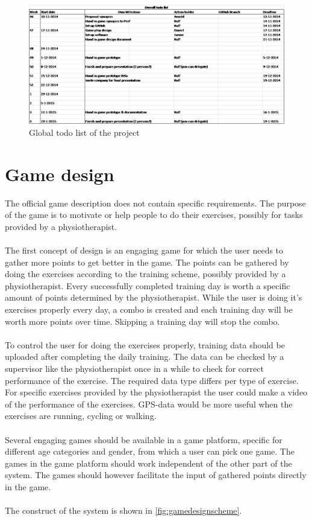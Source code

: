 \documentclass[a4paper,11pt,notitlepage]{report}
\begin{document}
\begin{figure}[H]
	\centering
		\includegraphics[width=1.00\textwidth]{Images/Todolist.png}
	\caption{Global todo list of the project}
	\label{fig:Todolist}
\end{figure}

\chapter{Game design}
The official game description does not contain specific requirements. The purpose of the game is to motivate or help people to do their exercises, possibly for tasks provided by a physiotherapist. \\
\\
The first concept of design is an engaging game for which the user needs to gather more points to get better in the game. The points can be gathered by doing the exercises according to the training scheme, possibly provided by a physiotherapist. Every successfully completed training day is worth a specific amount of points determined by the physiotherapist. While the user is doing it's exercises properly every day, a combo is created and each training day will be worth more points over time. Skipping a training day will stop the combo. \\
\\
To control the user for doing the exercises properly, training data should be uploaded after completing the daily training. The data can be checked by a supervisor like the physiotherapist once in a while to check for correct performance of the exercise. The required data type differs per type of exercise. For specific exercises provided by the physiotherapist the user could make a video of the performance of the exercises. GPS-data would be more useful when the exercises are running, cycling or walking. \\
\\
Several engaging games should be available in a game platform, specific for different age categories and gender, from which a user can pick one game. The games in the game platform should work independent of the other part of the system. The games should however facilitate the input of gathered points directly in the game. \\
\\
The construct of the system is shown in \ref{fig:gamedesignscheme}. 
\end{document}

